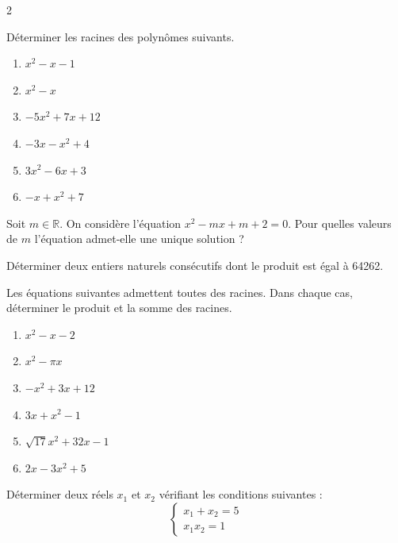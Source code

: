\documentclass[a4paper,12pt]{article}
\begin{document}
\begin{multicols}{2}
\begin{exercice}[title=Exercice 4 \quad$\star$\quad\  {[Calculer]}]{}{}
Déterminer les racines des polynômes suivants.
\begin{enumerate}
    \item \(x^2 - x - 1\)
    \item \(x^2 - x\)
    \item \(-5x^2 + 7x + 12\)
    \item \(-3x - x^2 + 4\)
    \item \(3x^2 - 6x + 3\)
    \item \(-x + x^2 + 7\)
\end{enumerate}
\end{exercice}

\begin{exercice}[title=Exercice 5 \quad$\star\star$\quad\ {[Calculer, Raisonner]}]{}{}
Soit \(m \in \mathbb{R}\). On considère l'équation \(x^2 - mx + m + 2 = 0\). Pour quelles valeurs de \(m\) l'équation admet-elle une unique solution ?
\end{exercice}

\begin{exercice}[title=Exercice 6 \quad$\star\star$\quad\ {[Calculer, Modéliser]}]{}{}
Déterminer deux entiers naturels consécutifs dont le produit est égal à 64262.
\end{exercice}

\begin{exercice}[title=Exercice 7 \quad$\star$\quad\  {[Calculer]}]{}{}
Les équations suivantes admettent toutes des racines. Dans chaque cas, déterminer le produit et la somme des racines.
\begin{enumerate}
    \item \(x^2 - x - 2\)
    \item \(x^2 - \pi x\)
    \item \(-x^2 + 3x + 12\)
    \item \(3x + x^2 - 1\)
    \item \(\sqrt{17}x^2 + 32x - 1\)
    \item \(2x - 3x^2 + 5\)
\end{enumerate}
\end{exercice}

\begin{exercice}[title=Exercice 8 \quad$\star\star$\quad\  {[Calculer]}]{}{}
Déterminer deux réels \(x_1\) et \(x_2\) vérifiant les conditions suivantes :
\begin{equation*}
\begin{cases}
x_1 + x_2 = 5 \\
x_1 x_2 = 1
\end{cases}
\end{equation*}
\end{exercice}


\end{multicols}
\end{document}
